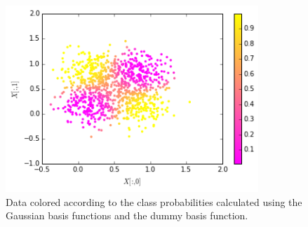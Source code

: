 \documentclass[a4paper,10pt]{article}
\numberwithin{equation}{section} %
\numberwithin{figure}{section} %
\numberwithin{table}{section} %
\theoremstyle{mytheor}
\begin{document}
\begin{enumerate}
\begin{figure}[h!]
   			\includegraphics[width=0.85\textwidth]{exercise2galaxy.png}\vspace{-0.4cm}
   			\caption{\vspace{-0.0cm} Data colored according to the class probabilities calculated using the Gaussian basis functions and the dummy basis function.}
  		\end{figure}
\end{enumerate}
\end{document}
